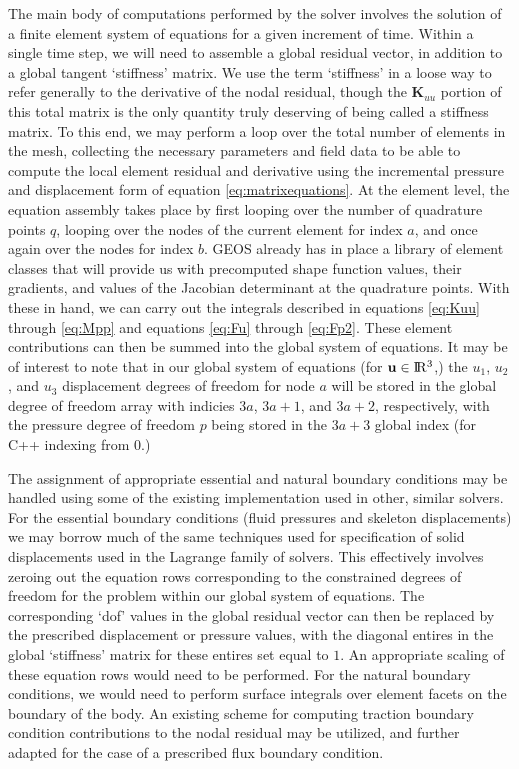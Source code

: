 \documentclass[11pt]{article} %
\begin{document}
The main body of computations performed by the solver involves the solution of a finite element system of equations for a given increment of time. Within a single time step, we will need to assemble a global residual vector, in addition to a global tangent `stiffness' matrix. We use the term `stiffness' in a loose way to refer generally to the derivative of the nodal residual, though the $\textbf{K}_{uu}$ portion of this total matrix is the only quantity truly deserving of being called a stiffness matrix. To this end, we may perform a loop over the total number of elements in the mesh, collecting the necessary parameters and field data to be able to compute the local element residual and derivative using the incremental pressure and displacement form of equation \ref{eq:matrixequations}. At the element level, the equation assembly takes place by first looping over the number of quadrature points $q$, looping over the nodes of the current element for index $a$, and once again over the nodes for index $b$. GEOS already has in place a library of element classes that will provide us with precomputed shape function values, their gradients, and values of the Jacobian determinant at the quadrature points. With these in hand, we can carry out the integrals described in equations \ref{eq:Kuu} through \ref{eq:Mpp} and equations \ref{eq:Fu} through \ref{eq:Fp2}. These element contributions can then be summed into the global system of equations. It may be of interest to note that in our global system of equations (for $\mathbf{u} \in \rm I\!R^3$,) the $u_1$, $u_2$, and $u_3$ displacement degrees of freedom for node $a$ will be stored in the global degree of freedom array with indicies $3a$, $3a + 1$, and $3a + 2$, respectively, with the pressure degree of freedom $p$ being stored in the $3a + 3$ global index (for C++ indexing from $0$.)

The assignment of appropriate essential and natural boundary conditions may be handled using some of the existing implementation used in other, similar solvers. For the essential boundary conditions (fluid pressures and skeleton displacements) we may borrow much of the same techniques used for specification of solid displacements used in the Lagrange family of solvers. This effectively involves zeroing out the equation rows corresponding to the constrained degrees of freedom for the problem within our global system of equations. The corresponding `dof' values in the global residual vector can then be replaced by the prescribed displacement or pressure values, with the diagonal entires in the global `stiffness' matrix for these entires set equal to $1$. An appropriate scaling of these equation rows would need to be performed. For the natural boundary conditions, we would need to perform surface integrals over element facets on the boundary of the body. An existing scheme for computing traction boundary condition contributions to the nodal residual may be utilized, and further adapted for the case of a prescribed flux boundary condition.
\end{document}
